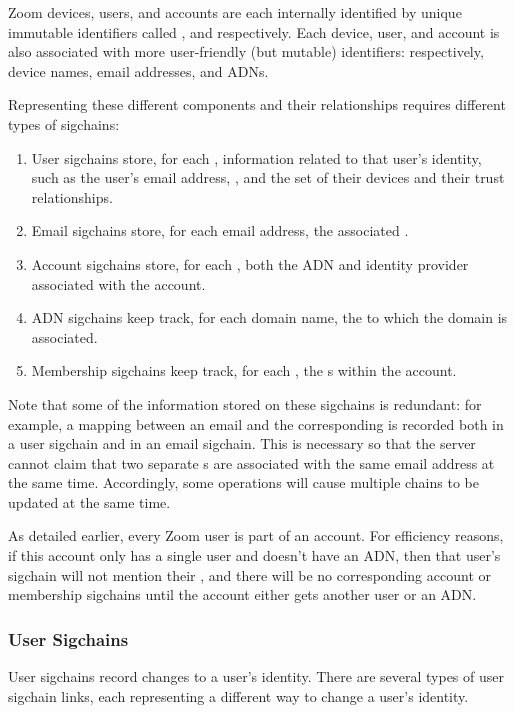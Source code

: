Zoom devices, users, and accounts are each internally identified by unique immutable identifiers
called \deviceid, \userID and \accountID respectively. Each device, user, and account is also
associated with more user-friendly (but mutable) identifiers: respectively, device names, email
addresses, and ADNs.

Representing these different components and their relationships requires different types of
sigchains:

\begin{enumerate}
\item User sigchains store, for each \userID, information related to that user’s identity, such as
    the user’s email address, \accountID, and the set of their devices and their trust
    relationships.
\item Email sigchains store, for each email address, the associated \userID.
\item Account sigchains store, for each \accountID, both the ADN and identity provider associated with
    the account.
\item ADN sigchains keep track, for each domain name, the \accountID to which the domain is
    associated.
\item Membership sigchains keep track, for each \accountID, the {\userID}s within the account.
\end{enumerate}

Note that some of the information stored on these sigchains is redundant: for example, a mapping
between an email and the corresponding \userID is recorded both in a user sigchain and in an email
sigchain. This is necessary so that the server cannot claim that two separate {\userID}s are
associated with the same email address at the same time. Accordingly, some operations will cause
multiple chains to be updated at the same time.

As detailed earlier, every Zoom user is part of an account. For efficiency reasons, if this account
only has a single user and doesn't have an ADN, then that user's sigchain will not mention their
\accountID, and there will be no corresponding account or membership sigchains until the
account either gets another user or an ADN.

\subsubsection{User Sigchains}

User sigchains record changes to a user’s identity. There are several types of user sigchain links,
each representing a different way to change a user's identity.

